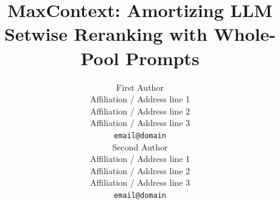 \documentclass[11pt]{article}
\title{MaxContext: Amortizing LLM Setwise Reranking with Whole-Pool Prompts}
\author{First Author \\
  Affiliation / Address line 1 \\
  Affiliation / Address line 2 \\
  Affiliation / Address line 3 \\
  \texttt{email@domain} \\\And
  Second Author \\
  Affiliation / Address line 1 \\
  Affiliation / Address line 2 \\
  Affiliation / Address line 3 \\
  \texttt{email@domain} \\}
\begin{document}
\maketitle
\begin{abstract}

\end{abstract}













%


\appendix

\end{document}
